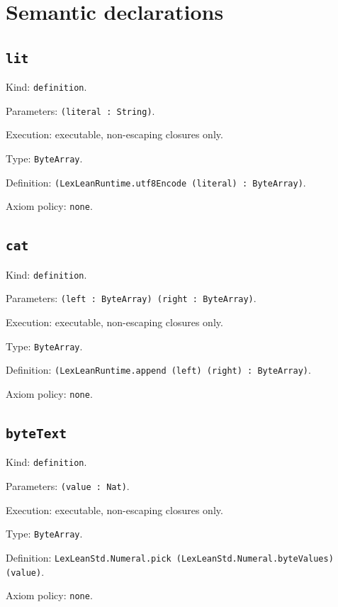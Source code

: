 \documentclass[11pt]{article}
\begin{document}
\section*{Semantic declarations}
\subsection*{\texttt{lit}}
\noindent Kind: \texttt{definition}.\par
\noindent Parameters: \texttt{(literal : String)}.\par
\noindent Execution: executable, non-escaping closures only.\par
\noindent Type: \texttt{ByteArray}.\par
\noindent Definition: \texttt{(LexLeanRuntime.utf8Encode (literal) : ByteArray)}.\par
\noindent Axiom policy: \texttt{none}.\par
\subsection*{\texttt{cat}}
\noindent Kind: \texttt{definition}.\par
\noindent Parameters: \texttt{(left : ByteArray) (right : ByteArray)}.\par
\noindent Execution: executable, non-escaping closures only.\par
\noindent Type: \texttt{ByteArray}.\par
\noindent Definition: \texttt{(LexLeanRuntime.append (left) (right) : ByteArray)}.\par
\noindent Axiom policy: \texttt{none}.\par
\subsection*{\texttt{byteText}}
\noindent Kind: \texttt{definition}.\par
\noindent Parameters: \texttt{(value : Nat)}.\par
\noindent Execution: executable, non-escaping closures only.\par
\noindent Type: \texttt{ByteArray}.\par
\noindent Definition: \texttt{LexLeanStd.Numeral.pick (LexLeanStd.Numeral.byteValues) (value)}.\par
\noindent Axiom policy: \texttt{none}.\par
\end{document}
